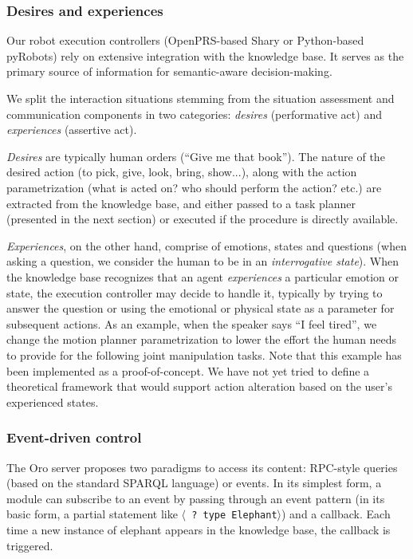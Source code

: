 \documentclass[preprint,5p]{elsarticle}
\newcommand{\stmt}[1]{{\footnotesize \tt $\langle$ #1\relax$\rangle$}}
\begin{document}
\subsubsection{Desires and experiences}

Our robot execution controllers (OpenPRS-based {\sc Shary} or Python-based {\sc
pyRobots}) rely on extensive integration with the knowledge base. It serves as the
primary source of information for semantic-aware decision-making.

We split the interaction situations stemming from the situation assessment and
communication components in two categories: \emph{desires} (performative act)
and \emph{experiences} (assertive act).

\emph{Desires} are typically human orders (``Give me that book''). The nature
of the desired action (to pick, give, look, bring, show...), along with the
action parametrization (what is acted on? who should perform the action? etc.)
are extracted from the knowledge base, and either passed to a task planner
(presented in the next section) or executed if the procedure is directly
available.

\emph{Experiences}, on the other hand, comprise of emotions, states and
questions (when asking a question, we consider the human to be in an
\emph{interrogative state}). When the knowledge base recognizes that an agent
\emph{experiences} a particular emotion or state, the execution controller may
decide to handle it, typically by trying to answer the question or using the
emotional or physical state as a parameter for subsequent actions. As an example,
when the speaker says ``I feel tired'', we change the motion planner
parametrization to lower the effort the human needs to provide for the following
joint manipulation tasks. Note that this example has been implemented as a
proof-of-concept. We have not yet tried to define a theoretical framework that
would support action alteration based on the user's experienced states.

\subsubsection{Event-driven control}

The {\sc Oro} server proposes two paradigms to access its content: RPC-style
queries (based on the standard SPARQL language) or events. In its simplest
form, a module can subscribe to an event by passing through an event pattern
(in its basic form, a partial statement like \stmt{? type Elephant}) and a
callback.  Each time a new instance of elephant appears in the knowledge base,
the callback is triggered.
\end{document}
